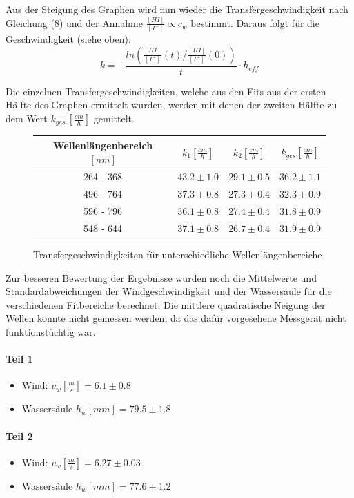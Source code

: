 \documentclass[12pt]{article}
\begin{document}
Aus der Steigung des Graphen wird nun wieder die Transfergeschwindigkeit nach Gleichung (8) und der Annahme $\frac{[HI]}{[I^-]} \propto c_w $ bestimmt.
Daraus folgt für die Geschwindigkeit (siehe oben):
\begin{equation}
k = - \frac{ln(\frac{[HI]}{[I^-]}(t)/\frac{[HI]}{[I^-]}(0))}{t} \cdot h_{eff}
\end{equation}

Die einzelnen Transfergeschwindigkeiten, welche aus den Fits aus der ersten Hälfte des Graphen ermittelt wurden, werden mit denen der zweiten Hälfte zu dem Wert $k_{ges} \, [\frac{cm}{h}]$ gemittelt. 

\begin{figure}[H]
	\centering
	\begin{tabular}{c|c|c|c}
		Wellenlängenbereich $[nm]$ & $k_1 [\frac{cm}{h}]$ & $k_2 [\frac{cm}{h}]$ & $k_{ges} [\frac{cm}{h}] $ \\ \hline
		264 - 368 & $43.2 \pm 1.0$ & $29.1 \pm 0.5$ & $36.2 \pm 1.1$ \\
		496 - 764 & $37.3 \pm 0.8$ & $27.3 \pm 0.4$ & $32.3 \pm 0.9$ \\
		596 - 796 & $36.1 \pm 0.8$ & $27.4 \pm 0.4$ & $31.8 \pm 0.9$ \\
		548 - 644 & $37.1 \pm 0.8$ & $26.7 \pm 0.4$ & $31.9 \pm 0.9$
	\end{tabular}
	\caption{Transfergeschwindigkeiten für unterschiedliche Wellenlängenbereiche}
\end{figure}

Zur besseren Bewertung der Ergebnisse wurden noch die Mittelwerte und Standardabweichungen der Windgeschwindigkeit und der Wassersäule für die verschiedenen Fitbereiche berechnet. Die mittlere quadratische Neigung der Wellen konnte nicht gemessen werden, da das dafür vorgesehene Messgerät nicht funktionstüchtig war.

\paragraph{Teil 1}
\begin{itemize}
	\item Wind: $v_w [\frac{m}{s}] = 6.1 \pm 0.8 $
	\item Wassersäule $h_w[mm] = 79.5 \pm 1.8 $
\end{itemize}
\paragraph{Teil 2}
\begin{itemize}
	\item Wind: $v_w [\frac{m}{s}] = 6.27 \pm 0.03 $
	\item Wassersäule $h_w[mm] = 77.6 \pm 1.2 $
\end{itemize}
\end{document}
